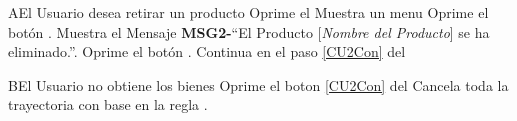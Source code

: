 		\begin{UCtrayectoriaA}{A}{El Usuario desea retirar un producto}
			\UCpaso [\UCactor] Oprime el 
			\UCpaso Muestra un menu 
			\UCpaso [\UCactor] Oprime el botón .
			\UCpaso Muestra el Mensaje {\bf MSG2-}``El Producto [{\em Nombre del Producto}] se ha eliminado.''.
			\UCpaso[\UCactor] Oprime el botón .
			\UCpaso Continua en el paso \ref{CU2Con} del 
			
		\end{UCtrayectoriaA}
		\begin{UCtrayectoriaA}{B}{El Usuario no obtiene los bienes}
			\UCpaso [\UCactor] Oprime el boton  \ref{CU2Con} del 
			\UCpaso Cancela toda la trayectoria con base en la regla .
			
			
		\end{UCtrayectoriaA}
		

		
		
		
